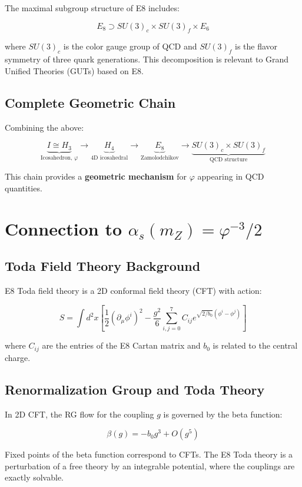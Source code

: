 \documentclass{article}
\begin{document}
The maximal subgroup structure of E8 includes:

\[
E_8 \supset SU(3)_c \times SU(3)_f \times E_6
\]

where $SU(3)_c$ is the color gauge group of QCD and $SU(3)_f$ is the flavor symmetry of three quark generations. This decomposition is relevant to Grand Unified Theories (GUTs) based on E8.

\subsection{Complete Geometric Chain}

Combining the above:

\[
\underbrace{I \cong H_3}_{\text{Icosahedron, }\varphi} \to \underbrace{H_4}_{\text{4D icosahedral}} \to \underbrace{E_8}_{\text{Zamolodchikov}} \to \underbrace{SU(3)_c \times SU(3)_f}_{\text{QCD structure}}
\]

This chain provides a \textbf{geometric mechanism} for $\varphi$ appearing in QCD quantities.

\section{Connection to $\alpha_s(m_Z) = \varphi^{-3}/2$}

\subsection{Toda Field Theory Background}

E8 Toda field theory is a 2D conformal field theory (CFT) with action:

\[
S = \int d^2x \left[ \frac{1}{2}(\partial_\mu \phi^i)^2 - \frac{g^2}{6} \sum_{i,j=0}^7 C_{ij} e^{\sqrt{2/b_0}(\phi^i - \phi^j)} \right]
\]

where $C_{ij}$ are the entries of the E8 Cartan matrix and $b_0$ is related to the central charge.

\subsection{Renormalization Group and Toda Theory}

In 2D CFT, the RG flow for the coupling $g$ is governed by the beta function:

\[
\beta(g) = -b_0 g^3 + O(g^5)
\]

Fixed points of the beta function correspond to CFTs. The E8 Toda theory is a perturbation of a free theory by an integrable potential, where the couplings are exactly solvable.
\end{document}
